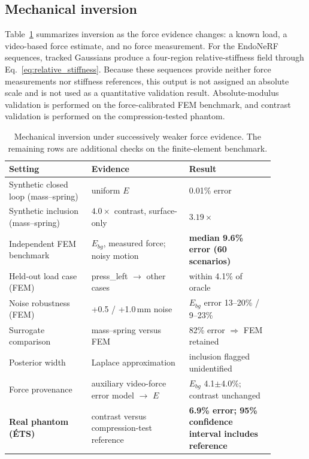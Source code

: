 \documentclass[pdflatex,lineno,referee,sn-vancouver,Numbered]{sn-jnl}
\begin{document}
\subsection{Mechanical inversion}
Table~\ref{tab:ladder} summarizes inversion as the force evidence changes:
a known load, a video-based force estimate, and no force measurement.
For the EndoNeRF sequences, tracked Gaussians produce a four-region
relative-stiffness field through Eq.~\eqref{eq:relative_stiffness}. Because
these sequences provide neither force measurements nor stiffness
references, this output is not assigned an absolute scale and is not used
as a quantitative validation result. Absolute-modulus validation is
performed on the force-calibrated FEM benchmark, and contrast validation is
performed on the compression-tested phantom.

\begin{table}[htbp]
\centering
\caption{Mechanical inversion under successively weaker force evidence.
The remaining rows are additional checks on the finite-element benchmark.}
\label{tab:ladder}
\small
\begin{tabular}{@{}p{0.27\linewidth}p{0.32\linewidth}p{0.29\linewidth}@{}}
\toprule
Setting & Evidence & Result \\
\midrule
Synthetic closed loop (mass--spring) & uniform $E$ & 0.01\% error \\
Synthetic inclusion (mass--spring) & $4.0\times$ contrast, surface-only & $3.19\times$ \\
Independent FEM benchmark & $E_{bg}$, measured force; noisy motion & \textbf{median 9.6\% error (60 scenarios)} \\
Held-out load case (FEM) & press\_left $\rightarrow$ other cases & within 4.1\% of oracle \\
Noise robustness (FEM) & +0.5 / +1.0\,mm noise & $E_{bg}$ error 13--20\% / 9--23\% \\
Surrogate comparison & mass--spring versus FEM & 82\% error $\Rightarrow$ FEM retained \\
Posterior width & Laplace approximation & inclusion flagged unidentified \\
Force provenance & auxiliary video-force error model $\rightarrow$ $E$ & $E_{bg}$ 4.1$\pm$4.0\%; contrast unchanged \\
\textbf{Real phantom (\'ETS)} & contrast versus compression-test reference & \textbf{6.9\% error; 95\% confidence interval includes reference} \\
\bottomrule
\end{tabular}
\end{table}
\end{document}
